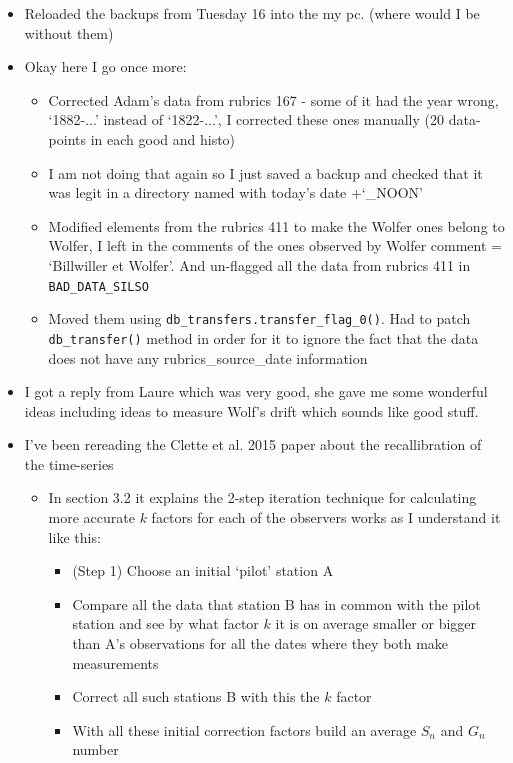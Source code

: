 \documentclass[12pt]{article}
\begin{document}
\begin{itemize}
    \item Reloaded the backups from Tuesday 16 into the my pc. (where would I be without them)
    \item Okay here I go once more:
    \begin{itemize}
        \item Corrected Adam's data from rubrics 167 - some of it had the year wrong, `1882-...' instead of `1822-...', I corrected these ones manually (20 data-points in each good and histo)
        \item I am not doing that again so I just saved a backup and checked that it was legit in a directory named with today's date +`\_NOON'
        \item Modified elements from the rubrics 411 to make the Wolfer ones belong to Wolfer, I left in the comments of the ones observed by Wolfer comment = `Billwiller et Wolfer'. And un-flagged all the data from rubrics 411 in \texttt{BAD\_DATA\_SILSO}
        \item Moved them using \texttt{db\_transfers.transfer\_flag\_0()}. Had to patch \texttt{db\_transfer()} method in order for it to ignore the fact that the data does not have any rubrics\_source\_date information
    \end{itemize}
    \item I got a reply from Laure which was very good, she gave me some wonderful ideas including ideas to measure Wolf's drift which sounds like good stuff.
    \item I've been rereading the Clette et al. 2015 paper about the recallibration of the time-series
    \begin{itemize}
        \item In section 3.2 it explains the 2-step iteration technique for calculating more accurate $k$ factors for each of the observers works as I understand it like this: 
        \begin{itemize}
            \item (Step 1) Choose an initial `pilot' station A
            \item Compare all the data that station B has in common with the pilot station and see by what factor $k$ it is on average smaller or bigger than A's observations for all the dates where they both make measurements
            \item Correct all such stations B with this the $k$ factor
            \item With all these initial correction factors build an average $S_n$ and $G_n$ number

\end{itemize}
\end{itemize}
\end{itemize}
\end{document}

